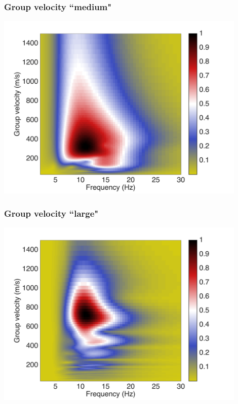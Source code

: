 \documentclass{beamer}
\begin{document}
\frame
{
\frametitle{{\bf Group velocity ``medium"}}
\centering
\includegraphics[width=0.9\textwidth]{../pics/C-45-135/group-velocity.png}
}
\frame
{
\frametitle{{\bf Group velocity ``large"}}
\centering
\includegraphics[width=0.9\textwidth]{../pics/C-78-405/group-velocity.png}
}
%                                                                                              
\end{document}
